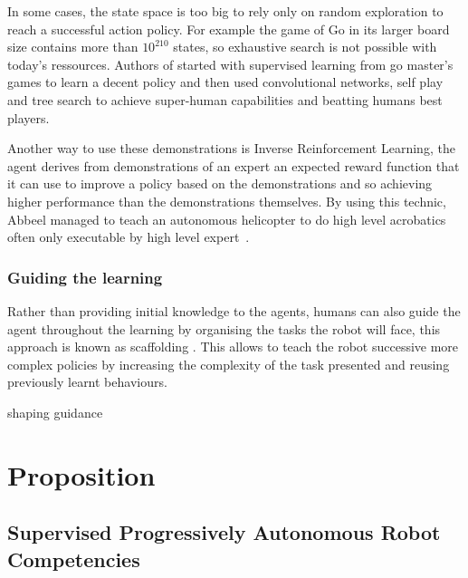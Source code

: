 \documentclass[letterpaper]{article} %
\begin{document}
In some cases, the state space is too big to rely only on random exploration to
reach a successful action policy. For example the game of Go in its larger board
size contains more than $10^{210}$ states, so exhaustive search is not possible
with today's ressources. Authors of \cite{silver2016mastering} started with
supervised learning from go master's games to learn a decent policy and then
used convolutional networks, self play and tree search to achieve super-human
capabilities and beatting humans best players.

Another way to use these demonstrations is Inverse
Reinforcement Learning, the agent derives from demonstrations of an expert an
expected reward function that it can use to improve a policy based on the
demonstrations and so achieving higher performance than the demonstrations
themselves. By using this technic, Abbeel managed to teach an autonomous
helicopter to do high level acrobatics often only executable by high level
expert~\cite{abbeel2004apprenticeship}. 


\subsubsection{Guiding the learning}
Rather than providing initial knowledge to the agents, humans can also guide the
agent throughout the learning by organising the tasks the robot will face, this
approach is known as scaffolding \cite{saunders2006teaching}. This allows to
teach the robot successive more complex policies by increasing the complexity of
the task presented and reusing previously learnt behaviours.


shaping
guidance


\section{Proposition}
\subsection{Supervised Progressively Autonomous Robot Competencies}
\end{document}
